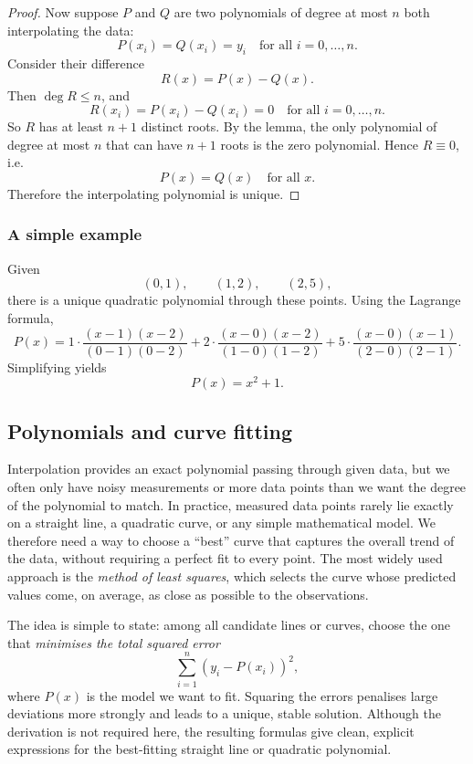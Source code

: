 \begin{proof}
\medskip
Now suppose $P$ and $Q$ are two polynomials of degree at most $n$ both
interpolating the data:
\[
P(x_i)=Q(x_i)=y_i \quad \text{for all } i=0,\dots,n.
\]
Consider their difference
\[
R(x)=P(x)-Q(x).
\]
Then $\deg R\le n$, and
\[
R(x_i)=P(x_i)-Q(x_i)=0 \quad \text{for all } i=0,\dots,n.
\]
So $R$ has at least $n\!+\!1$ distinct roots.  
By the lemma, the only polynomial of degree at most $n$ that can have
$n\!+\!1$ roots is the zero polynomial.  Hence $R\equiv 0$, i.e.
\[
P(x)=Q(x)\quad\text{for all }x.
\]
Therefore the interpolating polynomial is unique.
\end{proof}
\subsubsection*{A simple example}

Given
\[
(0,1),\qquad (1,2),\qquad (2,5),
\]
there is a unique quadratic polynomial through these points.  Using the
Lagrange formula,
\[
P(x)=1\cdot \frac{(x-1)(x-2)}{(0-1)(0-2)}
      +2\cdot \frac{(x-0)(x-2)}{(1-0)(1-2)}
      +5\cdot \frac{(x-0)(x-1)}{(2-0)(2-1)}.
\]
Simplifying yields
\[
P(x)=x^2+1.
\]

\subsection{Polynomials and curve fitting}

Interpolation provides an exact polynomial passing through given data,
but  we often only have noisy measurements or more data points
than we want the degree of the polynomial to match.  
In practice, measured data points rarely lie exactly on a straight line, a
quadratic curve, or any simple mathematical model.  We therefore need a way
to choose a ``best'' curve that captures the overall trend of the data,
without requiring a perfect fit to every point.  The most widely used
approach is the \emph{method of least squares}, which selects the curve
whose predicted values come, on average, as close as possible to the
observations.

The idea is simple to state: among all candidate lines or curves, choose the
one that \emph{minimises the total squared error}
\[
\sum_{i=1}^n (y_i - P(x_i))^2,
\]
where $P(x)$ is the model we want to fit.  Squaring the errors penalises
large deviations more strongly and leads to a unique, stable solution.
Although the derivation is not required here, the resulting formulas give
clean, explicit expressions for the best-fitting straight line or quadratic
polynomial.

